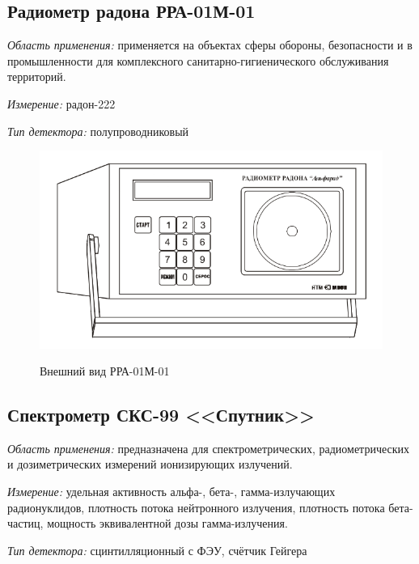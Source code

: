 \documentclass[14pt,pscyr,titlepage]{hedreport}
\begin{document}
	\pagebreak

	\subsection{Радиометр радона РРА-01М-01}
		\emph{Область применения:} применяется на объектах сферы обороны, 
			безопасности и в промышленности для комплексного 
			санитарно-гигиенического обслуживания территорий.

		\emph{Измерение:} радон-222

		\emph{Тип детектора:} полупроводниковый

		\begin{figure}[h!]
			\center
			\includegraphics[width=.8\textwidth]{RRA-01M-01} \\
			\caption{Внешний вид РРА-01М-01}
		\end{figure}

	\pagebreak

	\subsection{Спектрометр СКС-99 <<Спутник>>}
		\emph{Область применения:} предназначена для спектрометрических, 
			радиометрических и дозиметрических измерений ионизирующих 
			излучений.

		\emph{Измерение:} удельная активность альфа-, бета-, гамма-излучающих 
			радионуклидов,  плотность потока нейтронного излучения, плотность 
			потока бета-частиц, мощность эквивалентной дозы гамма-излучения.

		\emph{Тип детектора:} сцинтилляционный с ФЭУ, счётчик Гейгера
\end{document}
